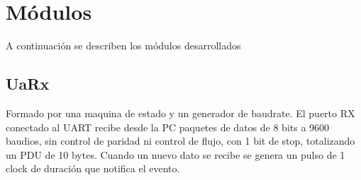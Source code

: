 \documentclass[12pt]{article}
\begin{document}
\section{Módulos}
A continuación se describen los módulos desarrollados
\subsection{UaRx}
Formado por una maquina de estado y un generador de baudrate. El puerto RX conectado al UART recibe desde la PC paquetes de datos de 8 bits a 9600 baudios, sin control de paridad ni control de flujo, con 1 bit de stop, totalizando un PDU de 10 bytes. Cuando un nuevo dato se recibe se genera un pulso de 1 clock de duración que notifica el evento.

\begin{figure}[H]
    \centering

\end{figure}
\end{document}

